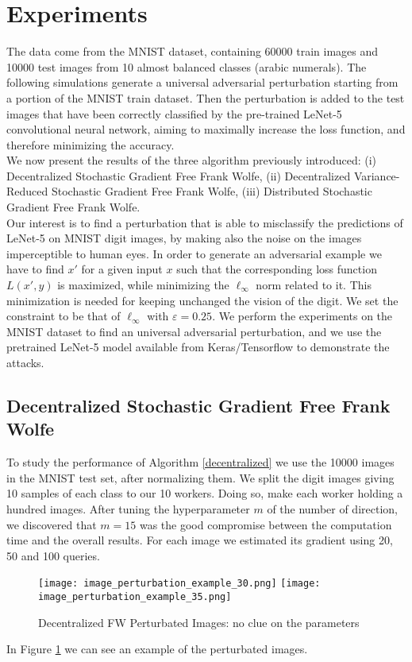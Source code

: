 \section{Experiments}
The data come from the MNIST dataset, containing 60000 train images and 10000 test images from 10 almost balanced classes (arabic numerals). The following simulations generate a universal adversarial perturbation starting from a portion of the MNIST train dataset. Then the perturbation is added to the test images that have been correctly classified by the pre-trained LeNet-5 convolutional neural network, aiming to maximally increase the loss function, and therefore minimizing the accuracy.\\
We now present the results of the three algorithm previously introduced: (i) Decentralized Stochastic Gradient Free Frank Wolfe, (ii) Decentralized Variance-Reduced Stochastic Gradient Free Frank Wolfe, (iii) Distributed Stochastic Gradient Free Frank Wolfe.\\
Our interest is to find a perturbation that is able to misclassify the predictions of LeNet-5 on MNIST digit images, by making also the noise on the images imperceptible to human eyes. In order to generate an adversarial example we have to find $x'$ for a given input $x$ such that the corresponding loss function $L(x',y)$ is maximized, while minimizing the $\ell_{\infty}$ norm related to it. This minimization is needed for keeping unchanged the vision of the digit. We set the constraint to be that of $\ell_{\infty}$ with $\varepsilon=0.25$. We perform the experiments on the MNIST dataset to find an universal adversarial perturbation, and we use the pretrained LeNet-5 model available from Keras/Tensorflow to demonstrate the attacks.

\subsection{Decentralized Stochastic Gradient Free Frank Wolfe}
To study the performance of Algorithm \ref{decentralized} we use the 10000 images in the MNIST test set, after normalizing them. We split the digit images giving 10 samples of each class to our 10 workers. Doing so, make each worker holding a hundred images. After tuning the hyperparameter $m$ of the number of direction, we discovered that $m=15$ was the good compromise between the computation time and the overall results. For each image we estimated its gradient using 20, 50 and 100 queries.

\begin{figure}[htbp]
	\centering
	\texttt{[image: image\_perturbation\_example\_30.png]}\hfil
	\texttt{[image: image\_perturbation\_example\_35.png]}
	\caption{Decentralized FW Perturbated Images: no clue on the parameters}
	\label{fig:decentralized}
\end{figure}
In Figure \ref{fig:decentralized} we can see an example of the perturbated images.

